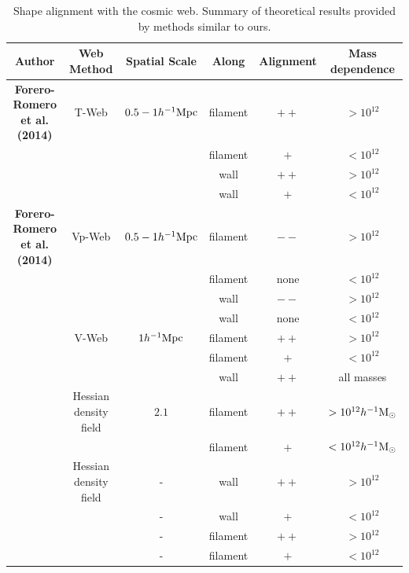 \documentclass[useAMS,usenatbib]{mn2e}
\newcommand{\hMpc}{{\ifmmode{h^{-1}{\rm Mpc}}\else{$h^{-1}$Mpc }\fi}}
\newcommand{\hMsun}{{\ifmmode{h^{-1}{\rm
        {M_{\odot}}}}\else{$h^{-1}{\rm{M_{\odot}}}$~}\fi}}
\begin{document}
\begin{table}
\begin{tabular}{cccccc}\hline\hline
Author & Web Method & Spatial Scale & Along &
Alignment & Mass dependence\\\hline

{\bf Forero-Romero et al. (2014)} & T-Web & $0.5-1 \hMpc$ & 
filament &$++$ & $>10^{12}$\hMsun\\
&   & & 
filament & $+$ & $<10^{12}$\hMsun\\

&   & & 
wall & $++$ & $>10^{12}$\hMsun\\

&   & & 
wall & $+$ & $<10^{12}$\hMsun\\\hline

{\bf Forero-Romero et al. (2014)} & Vp-Web & $0.5-1 \hMpc$ & 
filament &$--$ & $>10^{12}$\hMsun\\
&   & & 
filament & none & $<10^{12}$\hMsun\\
&   & & 
wall & $--$ & $>10^{12}$\hMsun\\

&   & & 
wall & none & $<10^{12}$\hMsun\\\hline


\cite{Libeskind2013} & V-Web & $1 \hMpc$ & 
filament &$++$ & $>10^{12}$\hMsun\\
&   & & 
filament &$+$ & $<10^{12}$\hMsun\\
&   & & 
wall & $++$ & all masses\\\hline

\cite{Zhang2009}  & Hessian density field &  $2.1$\hMpc & 
filament & $++$ & $>10^{12}\hMsun$\\

& &  & 
filament & $+$ & $<10^{12}\hMsun$\\\hline

\cite{AragonCalvo2007} & Hessian density field & - &
wall & $++$ & $>10^{12}$\hMsun\\

& & - &
wall & $+$ & $<10^{12}$\hMsun\\

& & - &
filament& $++$ & $>10^{12}$\hMsun\\

& & - &
filament& $+$ & $<10^{12}$\hMsun\\\hline \hline

\end{tabular}\\
\caption{Shape alignment with the cosmic web. Summary of theoretical
  results provided by methods similar to ours.}
\end{table}
\end{document}
